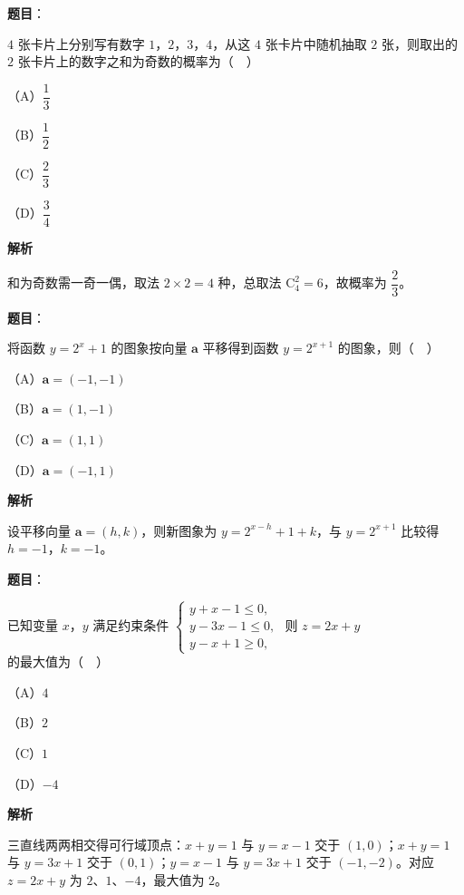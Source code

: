 \begin{answer}

\textbf{题目}：

$4$ 张卡片上分别写有数字 $1$，$2$，$3$，$4$，从这 $4$ 张卡片中随机抽取 $2$ 张，则取出的 $2$ 张卡片上的数字之和为奇数的概率为（　）

（A）$\dfrac13$

（B）$\dfrac12$

（C）$\dfrac23$

（D）$\dfrac34$

\textbf{解析}

和为奇数需一奇一偶，取法 $2\times2=4$ 种，总取法 $\mathrm C_4^2=6$，故概率为 $\dfrac23$。


\end{answer}
\begin{answer}

\textbf{题目}：

将函数 $y=2^x+1$ 的图象按向量 $\boldsymbol a$ 平移得到函数 $y=2^{x+1}$ 的图象，则（　）

（A）$\boldsymbol a=(-1,-1)$

（B）$\boldsymbol a=(1,-1)$

（C）$\boldsymbol a=(1,1)$

（D）$\boldsymbol a=(-1,1)$

\textbf{解析}

设平移向量 $\boldsymbol a=(h,k)$，则新图象为 $y=2^{x-h}+1+k$，与 $y=2^{x+1}$ 比较得 $h=-1$，$k=-1$。


\end{answer}
\begin{answer}

\textbf{题目}：

已知变量 $x$，$y$ 满足约束条件 $\begin{cases}y+x-1\leqslant0,\\ y-3x-1\leqslant0,\\ y-x+1\geqslant0,\end{cases}$ 则 $z=2x+y$ 的最大值为（　）

（A）$4$

（B）$2$

（C）$1$

（D）$-4$

\textbf{解析}

三直线两两相交得可行域顶点：$x+y=1$ 与 $y=x-1$ 交于 $(1,0)$；$x+y=1$ 与 $y=3x+1$ 交于 $(0,1)$；$y=x-1$ 与 $y=3x+1$ 交于 $(-1,-2)$。对应 $z=2x+y$ 为 $2$、$1$、$-4$，最大值为 $2$。


\end{answer}
